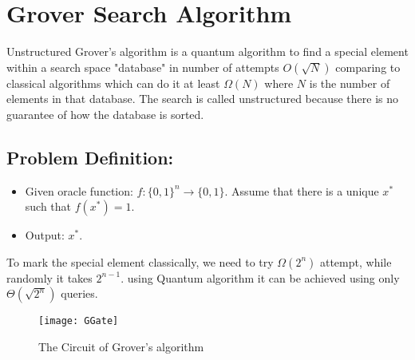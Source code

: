 \documentclass[11pt]{article}
\begin{document}
\section{Grover Search Algorithm}
Unstructured Grover's algorithm is a quantum algorithm to find a
special element within a search space "database" in number of attempts
$O(\sqrt N)$ comparing to classical algorithms which can do it at
least $\Omega(N)$ where $N$ is the number of elements in that
database. The search is called unstructured because there is no
guarantee of how the database is sorted.

\subsection{Problem Definition:}
\begin{itemize}
\item Given oracle function: $f:\{0,1\}^n \rightarrow \{0,1\}$. Assume
  that there is a unique $x^*$ such that $f(x^*) = 1$.
\item Output: $x^*$.
\end{itemize}


To mark the special element classically, we need to try $\Omega(2^n)$
attempt, while randomly it takes $2^{n-1}$. using Quantum algorithm it
can be achieved using only $\Theta(\sqrt{2^n})$ queries.
\begin{figure}[h]
\texttt{[image: GGate]}
\caption{The Circuit of Grover's algorithm}
\end{figure}
\end{document}
